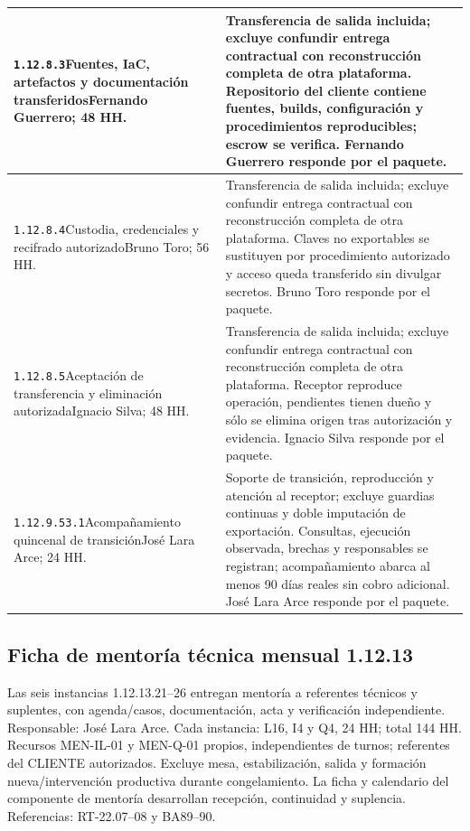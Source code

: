 \begin{longtable}{L{52mm}L{91mm}}
\texttt{1.\allowbreak{}12.\allowbreak{}8.\allowbreak{}3}\newline Fuentes, IaC, artefactos y documentación transferidos\newline Fernando Guerrero; 48 HH. & Transferencia de salida incluida; excluye confundir entrega contractual con reconstrucción completa de otra plataforma. Repositorio del cliente contiene fuentes, builds, configuración y procedimientos reproducibles; escrow se verifica. Fernando Guerrero responde por el paquete.\\\hline
\texttt{1.\allowbreak{}12.\allowbreak{}8.\allowbreak{}4}\newline Custodia, credenciales y recifrado autorizado\newline Bruno Toro; 56 HH. & Transferencia de salida incluida; excluye confundir entrega contractual con reconstrucción completa de otra plataforma. Claves no exportables se sustituyen por procedimiento autorizado y acceso queda transferido sin divulgar secretos. Bruno Toro responde por el paquete.\\\hline
\texttt{1.\allowbreak{}12.\allowbreak{}8.\allowbreak{}5}\newline Aceptación de transferencia y eliminación autorizada\newline Ignacio Silva; 48 HH. & Transferencia de salida incluida; excluye confundir entrega contractual con reconstrucción completa de otra plataforma. Receptor reproduce operación, pendientes tienen dueño y sólo se elimina origen tras autorización y evidencia. Ignacio Silva responde por el paquete.\\\hline
\texttt{1.\allowbreak{}12.\allowbreak{}9.\allowbreak{}53.\allowbreak{}1}\newline Acompañamiento quincenal de transición\newline José Lara Arce; 24 HH. & Soporte de transición, reproducción y atención al receptor; excluye guardias continuas y doble imputación de exportación. Consultas, ejecución observada, brechas y responsables se registran; acompañamiento abarca al menos 90 días reales sin cobro adicional. José Lara Arce responde por el paquete.\\\hline
\end{longtable}
\endgroup
{}

\subsection{Ficha de mentoría técnica mensual 1.12.13}
Las seis instancias 1.12.13.21--26 entregan mentoría a referentes técnicos y suplentes, con agenda/casos, documentación, acta y verificación independiente. Responsable: José Lara Arce. Cada instancia: L16, I4 y Q4, 24 HH; total 144 HH. Recursos MEN-IL-01 y MEN-Q-01 propios, independientes de turnos; referentes del CLIENTE autorizados. Excluye mesa, estabilización, salida y formación nueva/intervención productiva durante congelamiento. La ficha y calendario del componente de mentoría desarrollan recepción, continuidad y suplencia. Referencias: RT-22.07--08 y BA89--90.
